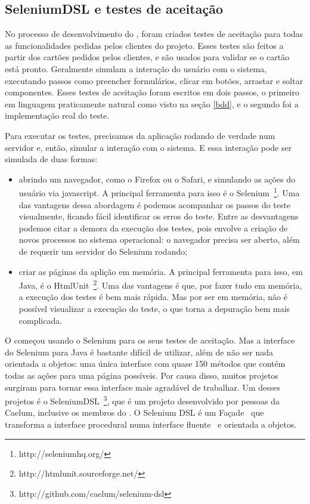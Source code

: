 \subsection{SeleniumDSL e testes de aceitação}
No processo de desenvolvimento do \calopsita, foram criados testes de aceitação para todas as
funcionalidades pedidas pelos clientes do projeto. Esses testes são feitos a partir dos cartões pedidos pelos clientes,
e são usados para validar se o cartão está pronto. Geralmente simulam a interação do usuário com o sistema, executando
passos como preencher formulários, clicar em botões, arrastar e soltar componentes. Esses testes de aceitação
foram escritos em dois passos, o primeiro em linguagem praticamente natural como visto na seção \ref{bdd}, e o segundo
foi a implementação real do teste.

Para executar os testes, precisamos da aplicação rodando de verdade num servidor e, então, simular a interação com o sistema. E essa interação pode ser simulada de duas formas:

\begin{itemize}
	\item{abrindo um navegador, como o Firefox ou o Safari, e simulando as ações do usuário via javascript. A principal	ferramenta para isso é o Selenium~\footnote{http://seleniumhq.org/}. Uma das vantagens dessa abordagem é podemos acompanhar os passos do teste visualmente, ficando fácil identificar os erros do teste. Entre as desvantagens podemos citar a demora da execução dos testes, pois envolve a criação de novos processos no sistema operacional: o navegador precisa ser aberto, além de requerir um servidor do Selenium rodando;}
	\item{criar as páginas da aplição em memória. A principal ferramenta para isso, em Java, é o HtmlUnit~\footnote{http://htmlunit.sourceforge.net/}. Uma das vantagens é que, por fazer tudo em memória, a execução dos testes é bem mais rápida. Mas por ser em memória, não é possível visualizar a execução do teste, o que torna a depuração bem mais complicada.}
\end{itemize}

O \calopsita começou usando o Selenium para os seus testes de aceitação. Mas a interface do Selenium para Java é bastante difícil de utilizar, além de não ser nada orientada a objetos: uma única interface com quase 150 métodos que contém todas as ações para uma página possíveis. Por causa disso, muitos projetos surgiram para tornar essa interface mais agradável de trabalhar. Um desses projetos é o SeleniumDSL~\footnote{http://github.com/caelum/selenium-dsl}, que é um projeto \opensource desenvolvido por pessoas da Caelum, inclusive os membros do \calopsita. O Selenium DSL é um Façade~\cite{gof} que transforma a interface procedural numa interface fluente~\cite{dsl} e orientada a objetos.

